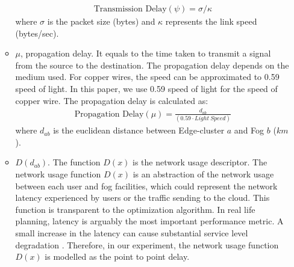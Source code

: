 \documentclass[10pt,journal,compsoc]{IEEEtran}
\begin{document}
\begin{enumerate}
\begin{itemize}
\begin{align}
\text{Transmission Delay} (\psi) =\sigma / \kappa
\end{align}
where $\sigma$ is the packet size (bytes) and $\kappa$ represents the link speed (bytes/sec).
\item  $\mu$, propagation delay. It equals to the time taken to transmit a signal from the source to the destination. The propagation delay depends on the medium used. For copper wires, the speed can be approximated to 0.59 speed of light. In this paper, we use 0.59 speed of light for the speed of copper wire. The propagation delay is calculated as:  
\begin{align}
\text{Propagation Delay} (\mu) = \frac{d_{ab}}{(0.59 \cdot Light\ Speed)}
\end{align}
where $d_{ab}$ is the euclidean distance between Edge-cluster $a$ and Fog $b$ ($km$). 

\item$D(d_{ab})$. The function $D(x)$ is the network usage descriptor. The network usage function $D(x)$ is an abstraction of the network usage between each user and fog facilities, which could represent the network latency experienced by users or the traffic sending to the cloud. This function is transparent to the optimization algorithm. %
In real life planning, latency is arguably the most important performance metric. A small increase in the latency can cause substantial service level degradation \cite{7833029,6678113}. Therefore, in our experiment, the network usage function $D(x)$ is modelled as the point to point delay. 



\end{itemize}
\end{enumerate}
\end{document}
